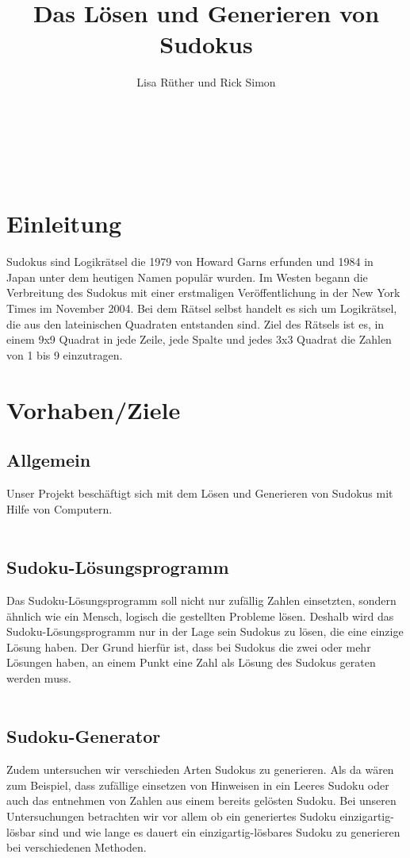 \documentclass[11pt,a4paper]{article}
\author{Lisa Rüther und Rick Simon}
\title{Das Lösen und Generieren von Sudokus}
\begin{document}
\maketitle
\newpage
\tableofcontents
\ \\
\listoffigures
\ \\
\listoftables

\newpage
\section{Einleitung}
Sudokus sind Logikrätsel die 1979 von Howard Garns erfunden und 1984 in Japan unter dem heutigen Namen populär wurden. Im Westen begann die Verbreitung des Sudokus mit einer erstmaligen Veröffentlichung in der New York Times im November 2004. Bei dem Rätsel selbst handelt es sich um Logikrätsel, die aus den lateinischen Quadraten entstanden sind. Ziel des Rätsels ist es, in einem 9x9 Quadrat in jede Zeile, jede Spalte und jedes 3x3 Quadrat die Zahlen von 1 bis 9 einzutragen.       

\section{Vorhaben/Ziele}
\subsection{Allgemein}
Unser Projekt beschäftigt sich mit dem Lösen und Generieren von Sudokus mit Hilfe von Computern.   \\
\ \\
\subsection{Sudoku-Lösungsprogramm}
Das Sudoku-Lösungsprogramm soll nicht nur zufällig Zahlen einsetzten, sondern ähnlich wie ein Mensch, logisch die gestellten Probleme lösen. Deshalb wird das Sudoku-Lösungsprogramm nur in der Lage sein Sudokus zu lösen, die eine einzige Lösung haben. Der Grund hierfür ist, dass bei Sudokus die zwei oder mehr Lösungen haben, an einem Punkt eine Zahl als Lösung des Sudokus geraten werden muss.\ \\
\ \\
\subsection{Sudoku-Generator}
Zudem untersuchen wir verschieden Arten Sudokus zu generieren. Als da wären zum Beispiel, dass zufällige einsetzen von Hinweisen in ein Leeres Sudoku oder auch das entnehmen von Zahlen aus einem bereits gelösten Sudoku. Bei unseren Untersuchungen betrachten wir vor allem ob ein generiertes Sudoku einzigartig-lösbar sind und wie lange es dauert ein einzigartig-lösbares Sudoku zu generieren bei verschiedenen Methoden.
\newpage
\end{document}
